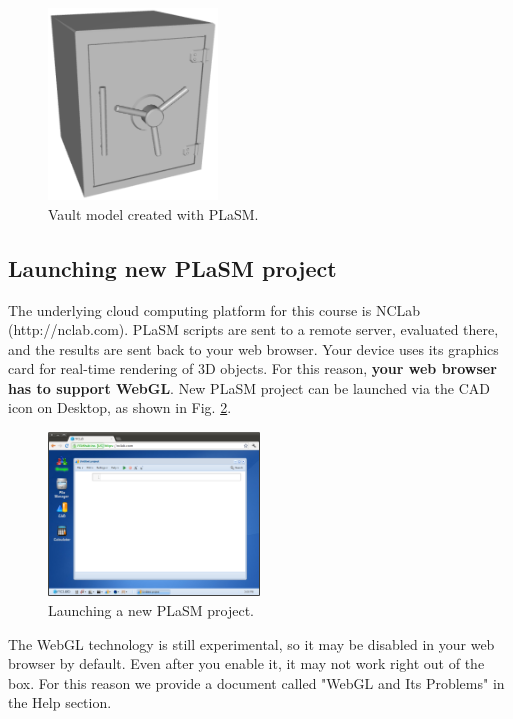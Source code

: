 \begin{figure}[!ht]
\begin{center}
\includegraphics[width=0.4\textwidth]{img/vault.png}
\end{center}
\vspace{-4mm}
\caption{Vault model created with PLaSM.}
\vspace{-1cm}
\label{fig:vault0}
\end{figure}


\subsection{Launching new PLaSM project}

The underlying cloud computing platform for this course is NCLab 
(http://nclab.com).
PLaSM scripts are sent to a remote server, evaluated there, 
and the results are sent back to your web browser. Your device uses
its graphics card for real-time rendering of 3D objects. For this 
reason, {\bf your web browser has to support WebGL}. 
New PLaSM project can be launched via the CAD icon on Desktop, as shown 
in Fig. \ref{fig:python}.

\begin{figure}[!ht]
\begin{center}
\includegraphics[width=0.5\textwidth]{img/python.png}
\end{center}
\vspace{-2mm}
\caption{Launching a new PLaSM project.}
\vspace{-1cm}
\label{fig:python}
\end{figure}
\newpage
\noindent
The WebGL technology is still experimental, so it may be disabled 
in your web browser by default. Even after you enable it, it may not work 
right out of the box. For this reason we provide a document called 
"WebGL and Its Problems" in the Help section.

